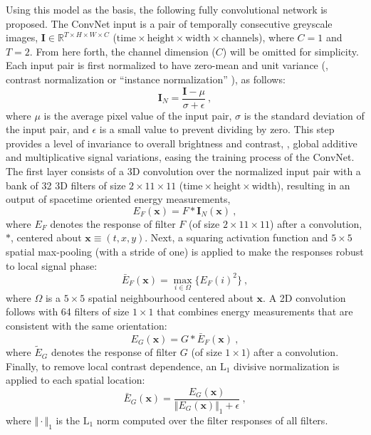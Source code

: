 Using this model as the basis, the following fully convolutional 
network \cite{shelhamer2017}  is proposed.
The ConvNet input is a pair of temporally consecutive greyscale images, $\mathbf{I} \in \mathbb{R}^{T \times H \times W \times C}$ ($\text{time} \times \text{height} \times \text{width} \times \text{channels}$), where $C=1$ and $T=2$. From here forth, the channel dimension ($C$) will be omitted for simplicity.
Each input pair is first normalized to have zero-mean and unit
variance (\ie, contrast normalization or ``instance normalization'' \cite{ulyanov2017}), as follows:
\begin{equation}
	\mathbf{I}_N = \frac{\mathbf{I} - \mu}{\sigma + \epsilon}\ ,
\end{equation}
where $\mu$ is the average pixel value of the input pair, $\sigma$ is the standard deviation of the input pair, and $\epsilon$ is a small value to prevent dividing by zero.
This step provides a level of invariance  to overall brightness and contrast, \ie, global additive and
multiplicative signal variations, easing the training process of the ConvNet. 
The first layer consists of a 3D convolution over the normalized input pair with a bank of 32 3D filters of size $2 \times 11 \times 11$
($\text{time} \times \text{height} \times \text{width}$), resulting in an output of spacetime oriented energy measurements, 
\begin{equation}
	E_F(\mathbf{x}) = F * \mathbf{I}_N(\mathbf{x})\ ,
\end{equation}
where $E_F$ denotes the response of filter $F$ (of size $2 \times 11 \times 11$) after a convolution, $*$, centered about $\mathbf{x} \equiv (t, x, y)$.
Next, a squaring activation function and $5 \times 5$
spatial max-pooling (with a stride of one) is applied to
make the responses robust to local signal phase:
\begin{equation}
	\bar{E}_F(\mathbf{x}) = \max_{i\in\Omega}\{E_F(i)^2\}\ ,
\end{equation}
where $\Omega$ is a $5 \times 5$ spatial neighbourhood centered about $\mathbf{x}$.
A 2D convolution follows with 64 filters of size $1 \times 1$ that combines
energy measurements that are consistent
with the same orientation:
\begin{equation}
	E_G(\mathbf{x}) = G * \bar{E}_F(\mathbf{x})\ ,
\end{equation}
where  $\tilde{E}_G$ denotes the response of filter $G$ (of size $1 \times 1$) after a convolution.
Finally, to remove local contrast dependence, an
$\text{L}_1$ divisive normalization is applied to each spatial location: 
\begin{equation}
	\bar{E}_G(\mathbf{x}) = \frac{E_G(\mathbf{x})}{\Vert E_G(\mathbf{x}) \Vert_1 + \epsilon}\ ,
\end{equation}
where $\Vert \cdot \Vert_1$ is the $\text{L}_1$ norm computed over the filter responses of all filters.

